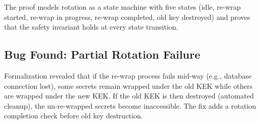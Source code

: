 The proof models rotation as a state machine with five states (idle, re-wrap
started, re-wrap in progress, re-wrap completed, old key destroyed) and proves
that the safety invariant holds at every state transition.

\subsection{Bug Found: Partial Rotation Failure}

Formalization revealed that if the re-wrap process fails mid-way (e.g.,
database connection lost), some secrets remain wrapped under the old KEK while
others are wrapped under the new KEK. If the old KEK is then destroyed
(automated cleanup), the un-re-wrapped secrets become inaccessible. The fix
adds a rotation completion check before old key destruction.


